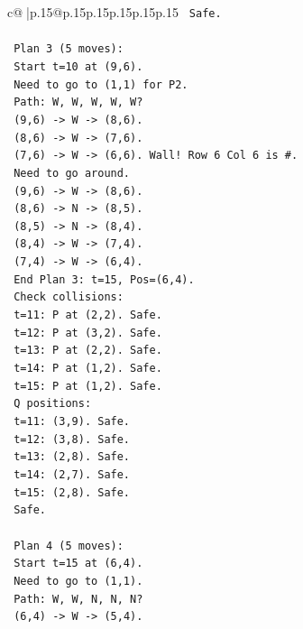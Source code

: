 \documentclass{article}
\begin{document}
{\begin{supertabular}{c@{$\;$}|p{.15\linewidth}@{}p{.15\linewidth}p{.15\linewidth}p{.15\linewidth}p{.15\linewidth}p{.15\linewidth}}
{{{\texttt{   Safe.} \\
\\ 
\texttt{   Plan 3 (5 moves):} \\
\texttt{   Start t=10 at (9,6).} \\
\texttt{   Need to go to (1,1) for P2.} \\
\texttt{   Path: W, W, W, W, W?} \\
\texttt{   (9,6) {-}> W {-}> (8,6).} \\
\texttt{   (8,6) {-}> W {-}> (7,6).} \\
\texttt{   (7,6) {-}> W {-}> (6,6). Wall! Row 6 Col 6 is \#.} \\
\texttt{   Need to go around.} \\
\texttt{   (9,6) {-}> W {-}> (8,6).} \\
\texttt{   (8,6) {-}> N {-}> (8,5).} \\
\texttt{   (8,5) {-}> N {-}> (8,4).} \\
\texttt{   (8,4) {-}> W {-}> (7,4).} \\
\texttt{   (7,4) {-}> W {-}> (6,4).} \\
\texttt{   End Plan 3: t=15, Pos=(6,4).} \\
\texttt{   Check collisions:} \\
\texttt{   t=11: P at (2,2). Safe.} \\
\texttt{   t=12: P at (3,2). Safe.} \\
\texttt{   t=13: P at (2,2). Safe.} \\
\texttt{   t=14: P at (1,2). Safe.} \\
\texttt{   t=15: P at (1,2). Safe.} \\
\texttt{   Q positions:} \\
\texttt{   t=11: (3,9). Safe.} \\
\texttt{   t=12: (3,8). Safe.} \\
\texttt{   t=13: (2,8). Safe.} \\
\texttt{   t=14: (2,7). Safe.} \\
\texttt{   t=15: (2,8). Safe.} \\
\texttt{   Safe.} \\
\\ 
\texttt{   Plan 4 (5 moves):} \\
\texttt{   Start t=15 at (6,4).} \\
\texttt{   Need to go to (1,1).} \\
\texttt{   Path: W, W, N, N, N?} \\
\texttt{   (6,4) {-}> W {-}> (5,4).} \\
}}}
\end{supertabular}}
\end{document}
